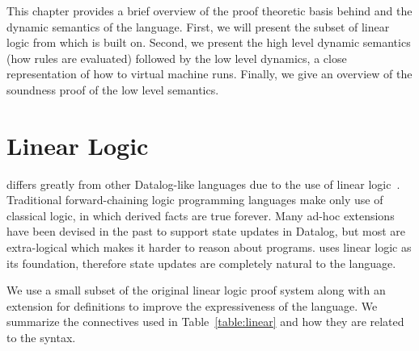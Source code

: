 \newcommand{\mz}{\m{match} \;}
\newcommand{\tab}[0]{\;\;\;\;}
\newcommand{\dz}{\m{derive} \;}
\newcommand{\comp}[0]{\m{comp} \;}
\newcommand{\az}{\m{apply} \;}
\newcommand{\doz}{\m{run} \;}
\newcommand{\seqnocut}[3]{#1 ; #2 \Rightarrow #3}
\newcommand{\defeq}{\buildrel\triangle\over =}
\newcommand{\compr}[1]{\m{def} \; #1}

\newcommand{\mo}{\m{match}_1 \;}
\newcommand{\cont}{\m{cont} \;}
\newcommand{\contc}{\m{contc} \;}
\newcommand{\done}{\m{derive}_1 \;}
\newcommand{\doo}{\m{run}_1 \;}
\newcommand{\mc}[0]{\m{match}_c \; }
\newcommand{\dall}[0]{\m{fix} \; }
\newcommand{\strans}[0]{\m{strans} \;}
\newcommand{\dc}{\m{derive}_c \;}
\newcommand{\ao}{\m{apply}_1 \;}

This chapter provides a brief overview of the proof theoretic basis behind \lang and the dynamic semantics
of the language. First, we will present the subset of linear logic from which \lang is built on. Second, we present the high level dynamic semantics (how rules are evaluated) followed by the low level dynamics, a close representation of how to virtual machine runs. Finally, we give an overview of the soundness proof of the low level semantics.

\section{Linear Logic}

\lang differs greatly from other Datalog-like languages due to the use of linear logic~\cite{Girard95logic:its}. Traditional forward-chaining logic programming languages make only use of classical logic, in which derived facts are true forever. Many ad-hoc extensions~\cite{Liu98extendingdatalog,Ludascher95alogical} have been devised in the past to support state updates in Datalog, but most are extra-logical which makes it harder to reason about programs.
\lang uses linear logic as its foundation, therefore state updates are completely natural to the language.

We use a small subset of the original linear logic proof system along with an extension for definitions to improve
the expressiveness of the language. We summarize the connectives used in Table~\ref{table:linear}
and how they are related to the \lang syntax.

